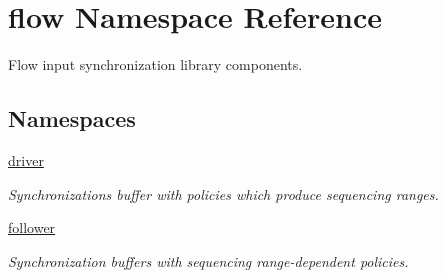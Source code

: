 \hypertarget{namespaceflow}{}\section{flow Namespace Reference}
\label{namespaceflow}


Flow input synchronization library components.  


\subsection*{Namespaces}
\begin{DoxyCompactItemize}
\item 
 \hyperlink{namespaceflow_1_1driver}{driver}
\begin{DoxyCompactList}\small\item\em Synchronizations buffer with policies which produce sequencing ranges. \end{DoxyCompactList}\item 
 \hyperlink{namespaceflow_1_1follower}{follower}
\begin{DoxyCompactList}\small\item\em Synchronization buffers with sequencing range-\/dependent policies. \end{DoxyCompactList}\end{DoxyCompactItemize}

